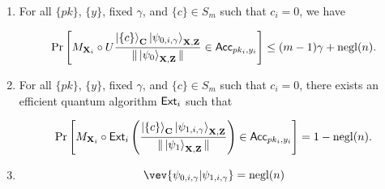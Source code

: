 \begin{lemma}
\begin{enumerate}
    
    
  
    
        \item 
For all $\{pk\}$, $\{y\}$, fixed $\gamma$, and $\{c\}\in S_m$ such that $c_i = 0$, we have 
 
     \begin{align*}
 \Pr\left[M_{\mathbf{X}_i}\circ U\frac{\ket{\{c\}}_{\mathbf{C}}\ket{\psi_{0,i,\gamma}}_{\mathbf{X},\mathbf{Z}}}{\|\ket{\psi_0}_{\mathbf{X},\mathbf{Z}}\|}\in \mathsf{Acc}_{pk_i,y_i}\right]\leq (m-1)\gamma+\operatorname{negl}(n).
 \end{align*}



    \item 
For all $\{pk\}$, $\{y\}$, fixed $\gamma$, and $\{c\}\in S_m$ such that $c_i = 0$, there exists an efficient quantum algorithm $\mathsf{Ext}_i$ such that 

\begin{align*}  
  \Pr\left[M_{\mathbf{X}_i}\circ \mathsf{Ext}_i\left(\frac{\ket{\{c\}}_{\mathbf{C}}\ket{\psi_{1,i,\gamma}}_{\mathbf{X},\mathbf{Z}}}{\|\ket{\psi_1}_{\mathbf{X},\mathbf{Z}}\|}\right)\in \mathsf{Acc}_{pk_i,y_i}\right]=1-\operatorname{negl}(n).
  \end{align*}
  
  
\item {}
$$\vev{\psi_{0,i,\gamma}|\psi_{1,i,\gamma}} = \negl(n)$$
\end{enumerate}
\end{lemma}
